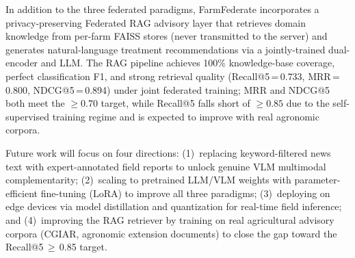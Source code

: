 \documentclass[10pt,journal,compsoc]{IEEEtran}
\begin{document}
In addition to the three federated paradigms, FarmFederate incorporates a privacy-preserving Federated RAG advisory layer that retrieves domain knowledge from per-farm FAISS stores (never transmitted to the server) and generates natural-language treatment recommendations via a jointly-trained dual-encoder and LLM. The RAG pipeline achieves 100\% knowledge-base coverage, perfect classification F1, and strong retrieval quality (Recall@5\,=\,0.733, MRR\,=\,0.800, NDCG@5\,=\,0.894) under joint federated training; MRR and NDCG@5 both meet the ${\geq}0.70$ target, while Recall@5 falls short of ${\geq}0.85$ due to the self-supervised training regime and is expected to improve with real agronomic corpora.

Future work will focus on four directions: (1)~replacing keyword-filtered news text with expert-annotated field reports to unlock genuine VLM multimodal complementarity; (2)~scaling to pretrained LLM/VLM weights with parameter-efficient fine-tuning (LoRA) to improve all three paradigms; (3)~deploying on edge devices via model distillation and quantization for real-time field inference; and (4)~improving the RAG retriever by training on real agricultural advisory corpora (CGIAR, agronomic extension documents) to close the gap toward the Recall@5\,$\geq$\,0.85 target.
\end{document}
